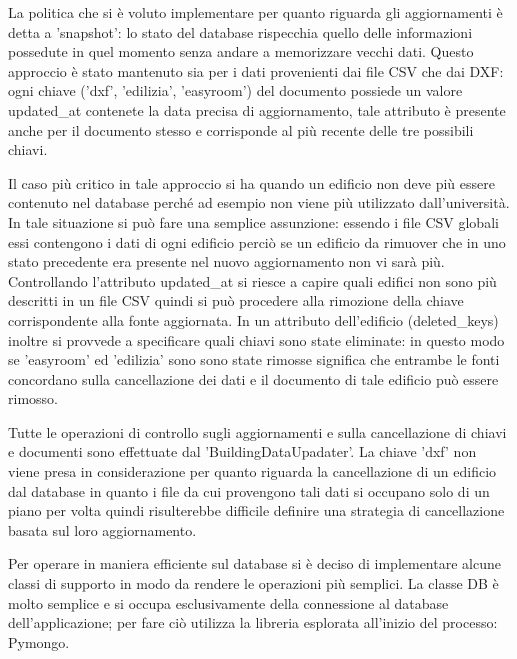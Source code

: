 \documentclass[12pt]{report}
\begin{document}
\vspace{5mm} %

La politica che si è voluto implementare per quanto riguarda gli aggiornamenti è detta a 'snapshot': lo stato del database rispecchia quello delle informazioni possedute in quel momento senza andare a memorizzare vecchi dati.
Questo approccio è stato mantenuto sia per i dati provenienti dai file CSV che dai DXF: ogni chiave ('dxf', 'edilizia', 'easyroom') del documento possiede un valore updated\_at contenete la data precisa di aggiornamento, tale attributo è presente anche per il documento stesso e corrisponde al più recente delle tre possibili chiavi.

Il caso più critico in tale approccio si ha quando un edificio non deve più essere contenuto nel database perché ad esempio non viene più utilizzato dall'università.
In tale situazione si può fare una semplice assunzione: essendo i file CSV globali essi contengono i dati di ogni edificio perciò se un edificio da rimuover che in uno stato precedente era presente nel nuovo aggiornamento non vi sarà più.
Controllando l'attributo updated\_at si riesce a capire quali edifici non sono più descritti in un file CSV quindi si può procedere alla rimozione della chiave corrispondente alla fonte aggiornata.
In un attributo dell'edificio (deleted\_keys) inoltre si provvede a specificare quali chiavi sono state eliminate: in questo modo se 'easyroom' ed 'edilizia' sono sono state rimosse significa che entrambe le fonti concordano sulla cancellazione dei dati e il documento di tale edificio può essere rimosso.

Tutte le operazioni di controllo sugli aggiornamenti e sulla cancellazione di chiavi e documenti sono effettuate dal 'BuildingDataUpadater'.
La chiave 'dxf' non viene presa in considerazione per quanto riguarda la cancellazione di un edificio dal database in quanto i file da cui provengono tali dati si occupano solo di un piano per volta quindi risulterebbe difficile definire una strategia di cancellazione basata sul loro aggiornamento.    

\vspace{5mm} %

Per operare in maniera efficiente sul database si è deciso di implementare alcune classi di supporto in modo da rendere le operazioni più semplici.
La classe DB è molto semplice e si occupa esclusivamente della connessione al database dell'applicazione; per fare ciò utilizza la libreria esplorata all'inizio del processo: Pymongo.
\end{document}
